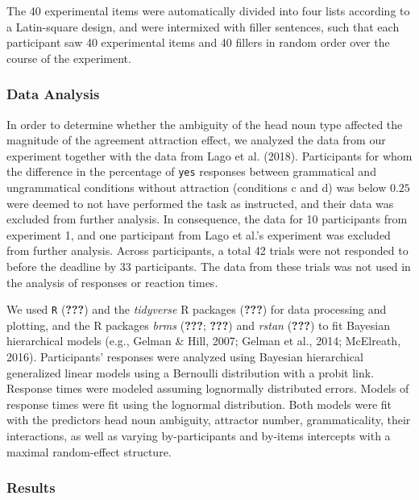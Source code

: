 \documentclass[doc]{apa6}
\begin{document}
The 40 experimental items were automatically divided into four lists according to a Latin-square design, and were intermixed with filler sentences, such that each participant saw 40 experimental items and 40 fillers in random order over the course of the experiment.

\hypertarget{data-analysis}{%
\subsubsection{Data Analysis}\label{data-analysis}}

In order to determine whether the ambiguity of the head noun type affected the magnitude of the agreement attraction effect, we analyzed the data from our experiment
together with the data from Lago et al. (2018).
Participants for whom the difference in the percentage of \texttt{yes} responses between grammatical and ungrammatical conditions without attraction (conditions c and d) was below \(0.25\) were deemed to not have performed the task as instructed, and their data was excluded from further analysis. In consequence, the data for 10 participants from experiment 1, and one participant from Lago et al.'s experiment was excluded from further analysis.
Across participants, a total 42 trials were not responded to before the deadline by 33 participants. The data from these trials was not used in the analysis of responses or reaction times.

We used \texttt{R} ({\textbf{???}}) and the \emph{tidyverse} R packages ({\textbf{???}}) for data processing and plotting, and the R packages \emph{brms} ({\textbf{???}}; {\textbf{???}}) and \emph{rstan} ({\textbf{???}}) to fit Bayesian hierarchical models (e.g., Gelman \& Hill, 2007; Gelman et al., 2014; McElreath, 2016).
Participants' responses were analyzed using Bayesian hierarchical generalized linear models using a Bernoulli distribution with a probit link.
Response times were modeled assuming lognormally distributed errors.
Models of response times were fit using the lognormal distribution. Both models were fit with the predictors
head noun ambiguity, attractor number, grammaticality, their interactions, as well as varying by-participants and by-items intercepts with a maximal random-effect structure.

\hypertarget{results}{%
\subsubsection{Results}\label{results}}
\end{document}
